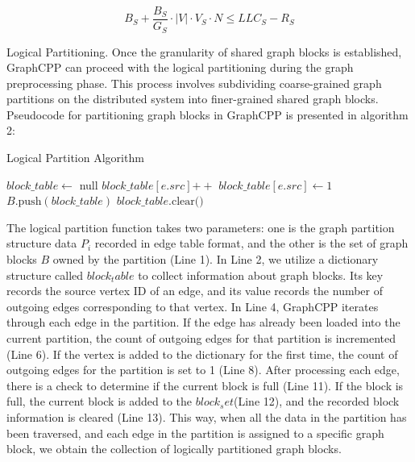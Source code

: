\documentclass[lettersize,journal]{IEEEtran} %
\begin{document}
\begin{equation}
    B_S + \frac{B_S}{G_S} \cdot \lvert V \rvert \cdot V_S \cdot N \leq LLC_S - R_S
    \end{equation}

Logical Partitioning. Once the granularity of shared graph blocks is established, GraphCPP can proceed with the logical partitioning during the graph preprocessing phase. This process involves subdividing coarse-grained graph partitions on the distributed system into finer-grained shared graph blocks. Pseudocode for partitioning graph blocks in GraphCPP is presented in algorithm 2:

\begin{algorithm}
\caption{Logical Partition Algorithm}
\begin{algorithmic}[1]
 
    \State $block\_table \gets$ null
      
            \State $block\_table[e.src] \mathrel{+{+}}$
        \Else
            \State $block\_table[e.src] \gets 1$
        \EndIf
            \State $B.\text{push}(block\_table)$
            \State $block\_table.\text{clear()}$
        \EndIf
    \EndFor
\EndFunction
\end{algorithmic}
\end{algorithm}

The logical partition function takes two parameters: one is the graph partition structure data $P_i$ recorded in edge table format, and the other is the set of graph blocks $B$ owned by the partition (Line 1). In Line 2, we utilize a dictionary structure called $block_table$ to collect information about graph blocks. Its key records the source vertex ID of an edge, and its value records the number of outgoing edges corresponding to that vertex. In Line 4, GraphCPP iterates through each edge in the partition. If the edge has already been loaded into the current partition, the count of outgoing edges for that partition is incremented (Line 6). If the vertex is added to the dictionary for the first time, the count of outgoing edges for the partition is set to 1 (Line 8). After processing each edge, there is a check to determine if the current block is full (Line 11). If the block is full, the current block is added to the $block_set $(Line 12), and the recorded block information is cleared (Line 13). This way, when all the data in the partition has been traversed, and each edge in the partition is assigned to a specific graph block, we obtain the collection of logically partitioned graph blocks.
\end{document}
